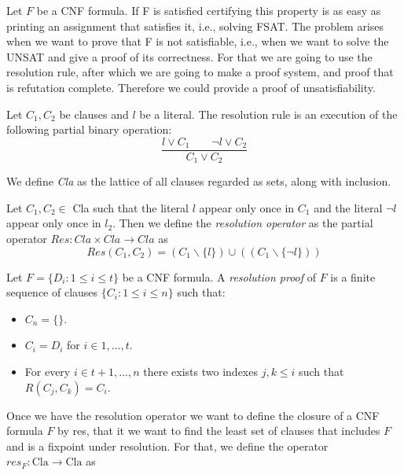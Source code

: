 Let $F$ be a CNF formula. If F is satisfied certifying this property is as easy as printing an assignment that satisfies it, i.e., solving FSAT. The problem arises when we want to prove that F is not satisfiable, i.e., when we want to solve the UNSAT and give a proof of its correctness. For that we are going to use the resolution rule, after which we are going to make a proof system, and proof that is refutation complete. Therefore we could provide a proof of unsatisfiability.

\begin{definition}
  Let $C_1,C_2$ be clauses and $l$ be a literal. The resolution rule is an execution of the following partial binary operation:
  $$\frac{l \lor C_1 \qquad \neg l \lor C_2}{ C_1 \lor C_2}$$
\end{definition}

\begin{definition}
  
We define \emph{Cla} as the lattice of all clauses regarded as sets, along with inclusion. 
\end{definition}

\begin{definition}
 Let $C_1,C_2\in$ Cla  such that the literal $l$ appear only once in $C_1$ and the literal $\neg l$ appear only once in $l_2$. Then we define the \emph{resolution operator} as the partial operator $Res: Cla \times Cla \to Cla$ as
  $$Res(C_1,C_2) = (C_1 \backslash \{l\}) \cup ((C_1 \backslash \{\neg l\}))$$
\end{definition}

\begin{definition}
  Let $F = \{D_i : 1 \le i \le t\}$ be a CNF formula. A \emph{resolution proof} of $F$ is a finite sequence of clauses $\{C_i : 1\le i \le n\}$ such that:
  \begin{itemize}
  \item $C_n = \{\}$.
  \item $C_i  = D_i $ for $i\in 1,...,t$.
  \item For every $i\in t+1,...,n$ there exists two indexes $j,k\le i$ such that $R(C_j,C_k)  = C_i$.
  \end{itemize}
\end{definition}

Once we have  the resolution operator we want to define the closure of a CNF formula $F$ by res, that it we want to find the least set of clauses that includes $F$ and is a fixpoint under resolution. For that, we define the operator $res_F:\text{Cla}\to\text{Cla}$ as

